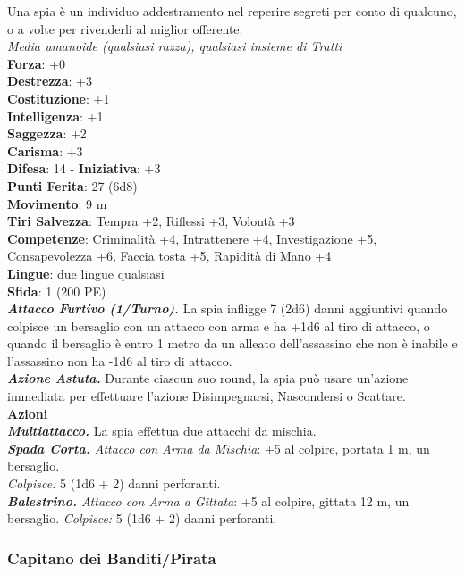 \begin{multicols}{2}
Una spia è un individuo addestramento nel reperire segreti per conto di qualcuno, o a volte per rivenderli al miglior offerente.\\
\emph{Media umanoide (qualsiasi razza), qualsiasi insieme di Tratti}\\
\textbf{Forza}: +0\\
\textbf{Destrezza}: +3\\
\textbf{Costituzione}: +1\\
\textbf{Intelligenza}: +1\\
\textbf{Saggezza}: +2\\
\textbf{Carisma}: +3\\
\textbf{Difesa}: 14 - \textbf{Iniziativa}: +3\\
\textbf{Punti Ferita}: 27 (6d8)\\
\textbf{Movimento}: 9 m\\
\textbf{Tiri Salvezza}: Tempra +2, Riflessi +3, Volontà +3 \\
\textbf{Competenze}: Criminalità +4, Intrattenere +4, Investigazione +5, Consapevolezza +6, Faccia tosta +5, Rapidità di Mano +4\\
\textbf{Lingue}: due lingue qualsiasi\\
\textbf{Sfida}: 1 (200 PE)\smallskip\\
\emph{\textbf{Attacco Furtivo (1/Turno).}} La spia infligge 7 (2d6) danni aggiuntivi quando colpisce un bersaglio con un attacco con arma e ha +1d6 al tiro di attacco, o quando il bersaglio è entro 1 metro da un alleato dell'assassino che non è inabile e l'assassino non ha -1d6 al tiro di attacco.\\
\emph{\textbf{Azione Astuta.}} Durante ciascun suo round, la spia può usare un'azione immediata per effettuare l'azione Disimpegnarsi, Nascondersi o Scattare.\\
\smallskip\textbf{Azioni} \\
\emph{\textbf{Multiattacco.}} La spia effettua due attacchi da mischia. \\
\emph{\textbf{Spada Corta.} Attacco con Arma da Mischia}: +5 al colpire, portata 1 m, un bersaglio.\\
\emph{Colpisce:} 5 (1d6 + 2) danni perforanti.\\
\emph{\textbf{Balestrino.} Attacco con Arma a Gittata}: +5 al colpire, gittata 12 m, un bersaglio. \emph{Colpisce:} 5 (1d6 + 2) danni perforanti.\\


\subsubsection{Capitano dei Banditi/Pirata}


\end{multicols}
